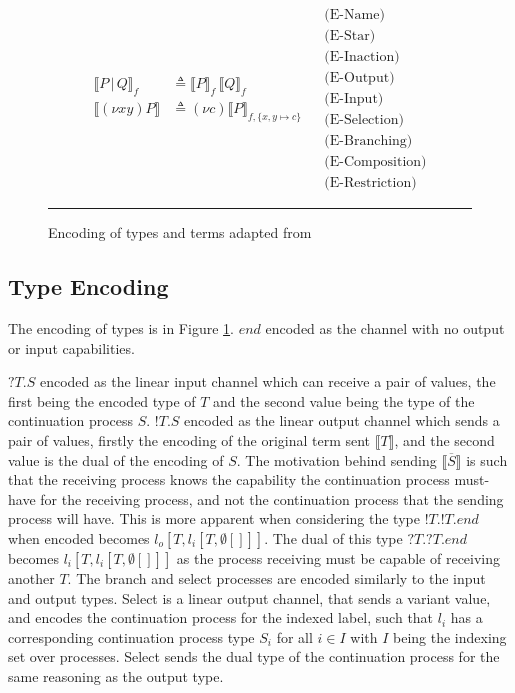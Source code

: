 \begin{figure}[h]
\begin{equation*}
\begin{split}
            \llbracket P \,|\, Q \rrbracket_f & \triangleq \llbracket P \rrbracket_f \, \llbracket Q \rrbracket_f \\
            \llbracket (\nu xy)P \rrbracket & \triangleq (\nu c) \llbracket P \rrbracket_{f, \{ x, y \mapsto c\}}
        \end{split}
        \begin{split}
            & \text{(E-Name)} \\
            & \text{(E-Star)} \\
            & \text{(E-Inaction)} \\
            & \text{(E-Output)} \\
            & \text{(E-Input)} \\
            & \text{(E-Selection)} \\
            & \text{(E-Branching)} \\
            & \text{(E-Composition)} \\
            & \text{(E-Restriction)}
        \end{split}
    \end{equation*}
    \noindent\rule{12cm}{0.8pt}
    \caption{Encoding of types and terms adapted from \citep{dardha2017session}}
    \label{fig:Encoding}
\end{figure}

\subsection{Type Encoding}

The encoding of types is in Figure \ref{fig:Encoding}. $end$ encoded as the channel with no output or input capabilities. 

$?T.S$ encoded as the linear input channel which can receive a pair of values, the first being the encoded type of $T$ and the second value being the type of the continuation process $S$. $!T.S$ encoded as the linear output channel which sends a pair of values, firstly the encoding of the original term sent $\llbracket T \rrbracket$, and the second value is the dual of the encoding of $S$. The motivation behind sending $\llbracket \overline{S} \rrbracket$ is such that the receiving process knows the capability the continuation process must-have for the receiving process, and not the continuation process that the sending process will have. This is more apparent when considering the type $!T.!T.end$ when encoded becomes $l_o[T, l_i[T, \emptyset[]]]$. The dual of this type $?T.?T.end$ becomes $l_i[T, l_i[T, \emptyset[]]]$ as the process receiving must be capable of receiving another $T$. 
The branch and select processes are encoded similarly to the input and output types. Select is a linear output channel, that sends a variant value, and encodes the continuation process for the indexed label, such that $l_i$ has a corresponding continuation process type $S_i$ for all $i \in I$ with $I$ being the indexing set over processes. Select sends the dual type of the continuation process for the same reasoning as the output type.


